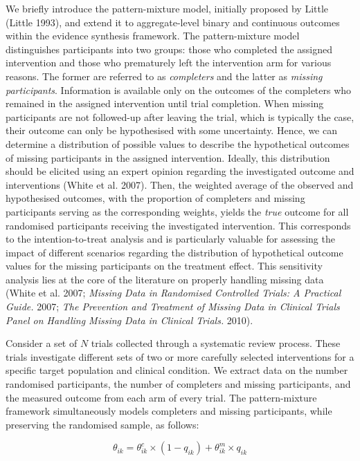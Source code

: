 We briefly introduce the pattern-mixture model, initially proposed by Little (Little 1993), and extend it to aggregate-level binary and continuous outcomes within the evidence synthesis framework. The pattern-mixture model distinguishes participants into two groups:
those who completed the assigned intervention and those who prematurely left the intervention arm for various reasons. The former are referred to as \emph{completers} and the latter as
\emph{missing participants}. Information is available only on the outcomes of the completers who remained in the assigned intervention until trial completion. When missing participants are not followed-up after leaving the trial, which is typically the case, their outcome can only be hypothesised with some uncertainty. Hence, we can determine a distribution of possible values to describe the hypothetical outcomes of missing participants in the assigned intervention. Ideally, this distribution should be elicited using an expert opinion regarding the investigated outcome and interventions (White et al. 2007).
Then, the weighted average of the observed and hypothesised outcomes, with the proportion of completers and missing participants serving as the corresponding weights, yields the \emph{true} outcome for all randomised participants receiving the investigated intervention. This corresponds to the intention-to-treat analysis and is particularly valuable for assessing the impact of different scenarios regarding the distribution of hypothetical outcome values for the missing participants on the treatment effect. This sensitivity analysis lies at the core of the literature on properly handling missing data (White et al. 2007; \emph{Missing Data in Randomised Controlled Trials: A Practical Guide.} 2007; \emph{The Prevention and Treatment of Missing Data in Clinical Trials Panel on Handling Missing Data in Clinical Trials.} 2010).

Consider a set of \(N\) trials collected through a systematic review process. These trials investigate different sets of two or more carefully selected interventions for a specific target population and clinical condition. We extract data on the number randomised participants, the number of completers and missing participants, and the measured outcome from each arm of every trial. The pattern-mixture framework simultaneously models completers and missing participants, while preserving the randomised
sample, as follows:

\[
\theta_{ik} = \theta^{c}_{ik} \times (1 - q_{ik}) + \theta^{m}_{ik} \times q_{ik} 
\tag{1}
\]

